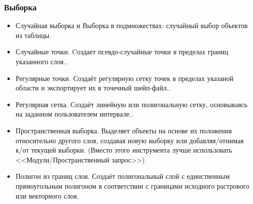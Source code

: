 \begin{frame}[allowframebreaks]
    \frametitle{Выборка}
    \begin{itemize}
        \item Случайная выборка и Выборка в подмножествах: случайный выбор объектов из таблицы.
        \item Случайные точки. Cоздает псевдо-случайные точки в пределах границ указанного слоя..
        \item Регулярные точки. Создаёт регулярную сетку точек в пределах указаной области и экспортирует их в точечный шейп-файл..
        \item Регулярная сетка. Создаёт линейную или полигональную сетку, основываясь на заданном пользователем интервале..
        \item Пространственная выборка. Выделяет объекты на основе их положения относительно другого слоя, создавая новую выборку или добавляя/отнимая к/от текущей выборки. (Вместо этого инструмента лучше использовать <<Модули/Пространственный запрос>>)
        \item Полигон из границ слоя. Создаёт полигональный слой с единственным прямоугольным полигоном в соответствии с границами исходного растрового или векторного слоя.
    \end{itemize}
\end{frame}



